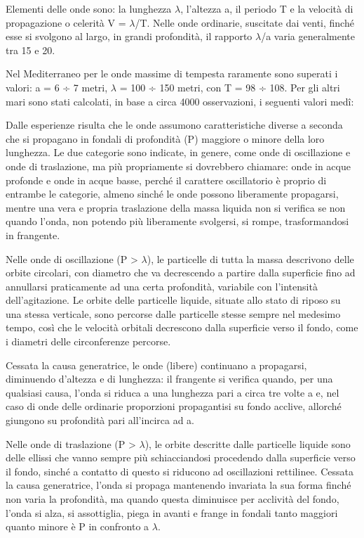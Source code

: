 \documentclass[a4paper]{article}
\begin{document}
Elementi delle onde sono: la lunghezza $\lambda$, l'altezza a, il periodo T e la velocità di propagazione o celerità V = $\lambda$/T. Nelle onde ordinarie, suscitate dai venti, finché esse si svolgono al largo, in grandi profondità, il rapporto $\lambda$/a varia generalmente tra 15 e 20.

Nel Mediterraneo per le onde massime di tempesta raramente sono superati i valori: a = 6 ÷ 7 metri, $\lambda$ = 100 ÷ 150 metri, con T = 98 ÷ 108. Per gli altri mari sono stati calcolati, in base a circa 4000 osservazioni, i seguenti valori medî:

Dalle esperienze risulta che le onde assumono caratteristiche diverse a seconda che si propagano in fondali di profondità (P) maggiore o minore della loro lunghezza. Le due categorie sono indicate, in genere, come onde di oscillazione e onde di traslazione, ma più propriamente si dovrebbero chiamare: onde in acque profonde e onde in acque basse, perché il carattere oscillatorio è proprio di entrambe le categorie, almeno sinché le onde possono liberamente propagarsi, mentre una vera e propria traslazione della massa liquida non si verifica se non quando l'onda, non potendo più liberamente svolgersi, si rompe, trasformandosi in frangente.

Nelle onde di oscillazione (P > $\lambda$), le particelle di tutta la massa descrivono delle orbite circolari, con diametro che va decrescendo a partire dalla superficie fino ad annullarsi praticamente ad una certa profondità, variabile con l'intensità dell'agitazione. Le orbite delle particelle liquide, situate allo stato di riposo su una stessa verticale, sono percorse dalle particelle stesse sempre nel medesimo tempo, così che le velocità orbitali decrescono dalla superficie verso il fondo, come i diametri delle circonferenze percorse.

Cessata la causa generatrice, le onde (libere) continuano a propagarsi, diminuendo d'altezza e di lunghezza: il frangente si verifica quando, per una qualsiasi causa, l'onda si riduca a una lunghezza pari a circa tre volte a e, nel caso di onde delle ordinarie proporzioni propagantisi su fondo acclive, allorché giungono su profondità pari all'incirca ad a.

Nelle onde di traslazione (P > $\lambda$), le orbite descritte dalle particelle liquide sono delle ellissi che vanno sempre più schiacciandosi procedendo dalla superficie verso il fondo, sinché a contatto di questo si riducono ad oscillazioni rettilinee. Cessata la causa generatrice, l'onda si propaga mantenendo invariata la sua forma finché non varia la profondità, ma quando questa diminuisce per acclività del fondo, l'onda si alza, si assottiglia, piega in avanti e frange in fondali tanto maggiori quanto minore è P in confronto a $\lambda$.
\end{document}
